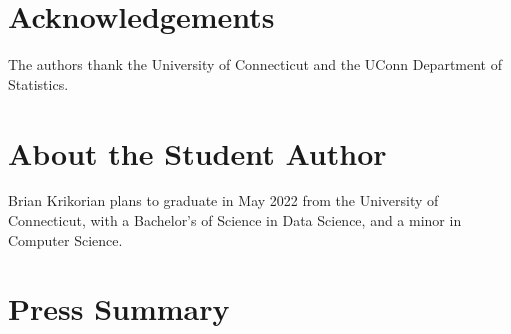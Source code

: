 \documentclass[12pt]{article}
\begin{document}


\section*{Acknowledgements}
The authors thank the University of Connecticut and the UConn Department of Statistics.






\section*{About the Student Author}
Brian Krikorian plans to graduate in May 2022 from the University of Connecticut, with a Bachelor's of Science in Data Science, and a minor in Computer Science.

\section*{Press Summary}
\end{document}
